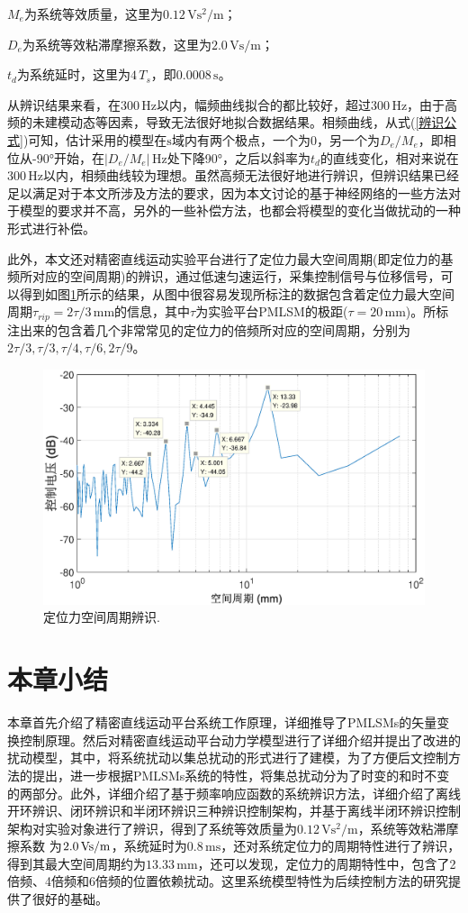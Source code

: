 $M_e$为系统等效质量，这里为$\text{0.12$\,$Vs$^{2}$/m}$；

$D_e$为系统等效粘滞摩擦系数，这里为$\text{2.0$\,$Vs/m}$；

$t_d$为系统延时，这里为$\text{4$\,T_s$}$，即$\text{0.0008$\,$s}$。

从辨识结果来看，在300\,Hz以内，幅频曲线拟合的都比较好，超过300\,Hz，由于高频的未建模动态等因素，导致无法很好地拟合数据结果。相频曲线，从式(\ref{辨识公式})可知，估计采用的模型在$\text{s}$域内有两个极点，一个为0，另一个为$D_e/M_e$，即相位从-90°开始，在$\left|D_e/M_e\right|$\,Hz处下降90°，之后以斜率为$t_d$的直线变化，相对来说在300\,Hz以内，相频曲线较为理想。虽然高频无法很好地进行辨识，但辨识结果已经足以满足对于本文所涉及方法的要求，因为本文讨论的基于神经网络的一些方法对于模型的要求并不高，另外的一些补偿方法，也都会将模型的变化当做扰动的一种形式进行补偿。

此外，本文还对精密直线运动实验平台进行了定位力最大空间周期(即定位力的基频所对应的空间周期)的辨识，通过低速匀速运行，采集控制信号与位移信号，可以得到如图\ref{空间周期辨识}所示的结果，从图中很容易发现所标注的数据包含着定位力最大空间周期$\tau_{rip}=2\tau/3\,\text{mm}$的信息，其中$\tau$为实验平台PMLSM的极距($\tau=20\,\text{mm}$)。所标注出来的包含着几个非常常见的定位力的倍频所对应的空间周期，分别为$2\tau/3,\tau/3,\tau/4,\tau/6,2\tau/9$。
\begin{figure}[H]
	\centering
	\includegraphics[width=12cm]{figures/空间周期辨识}
	\caption{定位力空间周期辨识.}
	\label{空间周期辨识}
\end{figure}
\section{本章小结}
本章首先介绍了精密直线运动平台系统工作原理，详细推导了PMLSMs的矢量变换控制原理。然后对精密直线运动平台动力学模型进行了详细介绍并提出了改进的扰动模型，其中，将系统扰动以集总扰动的形式进行了建模，为了方便后文控制方法的提出，进一步根据PMLSMs系统的特性，将集总扰动分为了时变的和时不变的两部分。此外，详细介绍了基于频率响应函数的系统辨识方法，详细介绍了离线开环辨识、闭环辨识和半闭环辨识三种辨识控制架构，并基于离线半闭环辨识控制架构对实验对象进行了辨识，得到了系统等效质量为$\text{0.12$\,$Vs$^{2}$/m}$，系统等效粘滞摩擦系数
为$\text{2.0\,Vs/m}$，系统延时为$\text{0.8$\,$ms}$，还对系统定位力的周期特性进行了辨识，得到其最大空间周期约为$13.33\,\text{mm}$，还可以发现，定位力的周期特性中，包含了2倍频、4倍频和6倍频的位置依赖扰动。这里系统模型特性为后续控制方法的研究提供了很好的基础。
